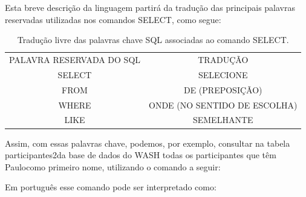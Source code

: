 \documentclass[
12pt,		%
openright,	%
twoside,  %
a4paper,			%
chapter=TITLE,		%
english,			%
french,				%
spanish,			%
brazil				%
]{USPSC-classe/USPSC}
\begin{document}
Esta breve descri\c{c}\~ao da linguagem partir\'a da tradu\c{c}\~ao das principais palavras reservadas utilizadas nos comandos SELECT, como segue:


















\begin{table}[htb]
\tiny
\caption{\label{83e82c686b7298dd0bc7475778644f6681053be7}Tradu\c{c}\~ao livre das palavras chave SQL associadas ao comando SELECT.}

\centering
\begin{tabular}{|c|c|}
\hline
PALAVRA RESERVADA DO SQL  &  TRADU\c{C}\~AO \\
SELECT  &  SELECIONE \\
FROM  &  DE (PREPOSI\c{C}\~AO) \\
WHERE  &  ONDE (NO SENTIDO DE ESCOLHA) \\
LIKE  &  SEMELHANTE \\
\hline
\end{tabular}
\end{table}


Assim, com essas palavras chave, podemos, por exemplo, consultar na tabela \textquotedbl participantes2\textquotedbl  da base de dados do WASH todas os participantes que t\^em \textquotedbl Paulo\textquotedbl  como primeiro nome, utilizando o comando a seguir:















\noindent\begin{center}\mbox{\centering{}}\end{center}


Em portugu\^es esse comando pode ser interpretado como:
\end{document}
